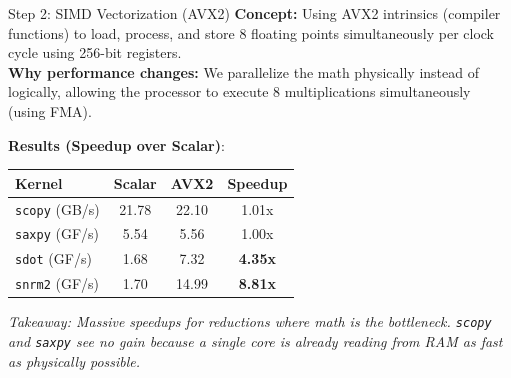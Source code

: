 \documentclass{beamer}
\begin{document}
\begin{frame}{Step 2: SIMD Vectorization (AVX2)}
    \textbf{Concept:} Using AVX2 intrinsics (compiler functions) to load, process, and store 8 floating points simultaneously per clock cycle using 256-bit registers.\\
    \vspace{0.2cm}
    \textbf{Why performance changes:} We parallelize the math physically instead of logically, allowing the processor to execute 8 multiplications simultaneously (using FMA).
    \vspace{0.2cm}
    
    \textbf{Results (Speedup over Scalar)}:
    \begin{table}[]
    \centering
    \begin{tabular}{@{}l|cc|c@{}}
    \toprule
    \textbf{Kernel} & \textbf{Scalar} & \textbf{AVX2} & \textbf{Speedup} \\ \midrule
    \texttt{scopy} (GB/s)   & 21.78           & 22.10         & 1.01x            \\
    \texttt{saxpy} (GF/s)   & 5.54            & 5.56          & 1.00x            \\
    \texttt{sdot} (GF/s)    & 1.68            & 7.32          & \textbf{4.35x}   \\
    \texttt{snrm2} (GF/s)   & 1.70            & 14.99         & \textbf{8.81x}   \\ \bottomrule
    \end{tabular}
    \end{table}
    
    \textit{Takeaway: Massive speedups for reductions where math is the bottleneck. \texttt{scopy} and \texttt{saxpy} see no gain because a single core is already reading from RAM as fast as physically possible.}
\end{frame}
\end{document}
